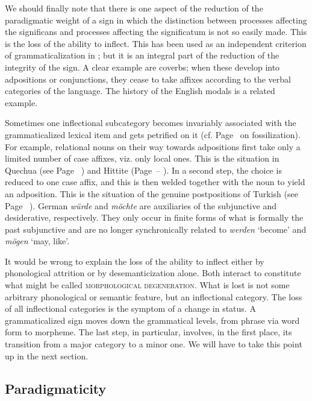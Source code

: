 We should finally note that there is one aspect of the reduction of the paradigmatic weight of a sign in which the distinction between processes affecting the significans and processes affecting the significatum is not so easily made. This is the loss of the ability to inflect. This has been used as an independent criterion of grammaticalization in \citet[84]{Givón1975}; but it is an integral part of the reduction of the integrity of the sign. A clear example are coverbs; when these develop into adpositions or conjunctions, they cease to take affixes according to the verbal categories of the language. The history of the English modals is a related example.

Sometimes one inflectional subcategory becomes invariably associated with the grammaticalized lexical item and gets petrified on it (cf. Page~\pageref{page147}\chk%
  on fossilization). For example, relational nouns on their way towards adpositions first take only a limited number of case affixes, viz. only local ones. This is the situation in Quechua (see Page~\pageref{page87}\chk%
) and Hittite (Page~\pageref{page98}--\pageref{page100b}\chk%
). In a second step, the choice is reduced to one case affix, and this is then welded together with the noun to yield an adposition. This is the situation of the genuine postpositions of Turkish (see Page~\pageref{page86}\chk%
). German \textit{würde} and \textit{möchte} are auxiliaries of the subjunctive and desiderative, respectively. They only occur in finite forms of what is formally the past subjunctive and are no longer synchronically related to \textit{werden} ‘become’ and \textit{mögen} ‘may, like’.

It would be wrong to explain the loss of the ability to inflect either by phonological attrition or by desemanticization alone. Both interact to constitute what might be called \textsc{morphological degeneration}. What is lost is not some arbitrary phonological or semantic feature, but an inflectional category. The loss of all inflectional categories is the symptom of a change in status. A grammaticalized sign moves down the grammatical levels, from phrase via word form to morpheme. The last step, in particular,  involves, in the first place, its transition from a major category to a minor one. We will have to take this point up in the next section.

\subsection{Paradigmaticity} \label{sec:4.2.2}


